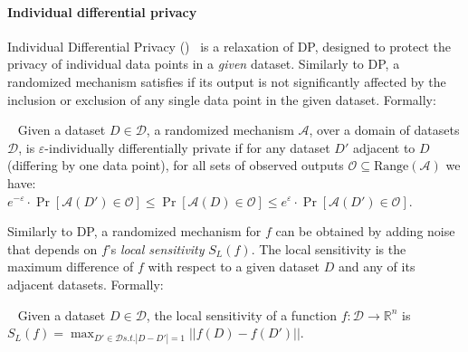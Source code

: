 \paragraph{Individual differential privacy} 
Individual Differential Privacy (\propi)~\citep{ref_88} is a relaxation of DP, designed to protect the privacy of individual data points in a \emph{given} dataset. 
Similarly to DP, a randomized mechanism satisfies \propi if its output is not significantly affected 
by the inclusion or exclusion of any single data point in the given dataset. Formally:
\begin{definition}~\label{def:individual_differential_privacy}
Given a dataset $D\in \mathcal{D}$, a randomized mechanism $\mathcal{A}$, over a domain of datasets $\mathcal{D}$, is $\varepsilon$-individually differentially private if for any dataset $D'$ adjacent to $D$ (differing by one data point), for all sets of observed outputs $\mathcal{O} \subseteq \text{Range}(\mathcal{A})$ we have:  \\
 $e^{-\varepsilon} \cdot \Pr[\mathcal{A}(D') \in \mathcal{O}] \leq\Pr[\mathcal{A}(D) \in \mathcal{O}] \leq e^{\varepsilon} \cdot \Pr[\mathcal{A}(D') \in \mathcal{O}]$. 
\end{definition}
Similarly to DP, a randomized mechanism for $f$ can be obtained by adding noise that depends on $f$'s \emph{local sensitivity} 
$S_L(f)$. The local sensitivity is the maximum difference of $f$ with respect to a given dataset $D$ and any of its adjacent datasets. Formally: 


\begin{definition}~\label{def:local_sensitivity}
Given a dataset $D\in \mathcal{D}$, 
the local sensitivity of a function $f:\mathcal{D}\rightarrow \mathbb{R}^n$ is 
$S_L(f)=\max_{D'\in \mathcal{D} s.t. |D-D'|= 1}{||f(D)-f(D')||}$.
\end{definition}


